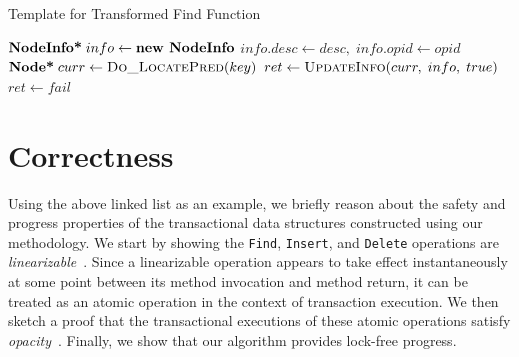 \documentclass[10pt,conference,compsocconf]{IEEEtran}
\newcommand\TRUE{\text{\textbf{true}}}
\newcommand\FALSE{\text{\textbf{false}}}
\begin{document}
\begin{algorithm}[t]
    \caption{Template for Transformed Find Function}
    \label{alg:listfind}
    \begin{algorithmic}[1]
        \State $\textbf{NodeInfo*}\; info \gets \text{\textbf{new NodeInfo}}$
        \State $info.desc \gets desc,\;info.opid \gets opid$
        \While{\TRUE} \label{l:listinsertwhile}
        \State $\textbf{Node*}\;curr \gets \Call{Do\_LocatePred}{key}$
        \State $ret \gets \Call{UpdateInfo}{curr,\;info,\;true}$
        \Else
        \State $ret \gets fail$
        \EndIf
        \State \Return \TRUE
         \label{l:findfail} 
        \State \Return \FALSE
        \EndIf
        \EndWhile
        \EndFunction
    \end{algorithmic}
\end{algorithm}

\section{Correctness}
\label{sec:correctness}
Using the above linked list as an example, we briefly reason about the safety and progress properties of the transactional data structures constructed using our methodology. 
We start by showing the \texttt{Find}, \texttt{Insert}, and \texttt{Delete} operations are \emph{linearizable}~\cite{herlihy2012art}.
Since a linearizable operation appears to take effect instantaneously at some point between its method invocation and method return, it can be treated as an atomic operation in the context of transaction execution.
We then sketch a proof that the transactional executions of these atomic operations satisfy \emph{opacity}~\cite{guerraoui2008correctness}.
Finally, we show that our algorithm provides lock-free progress. 
\end{document}
